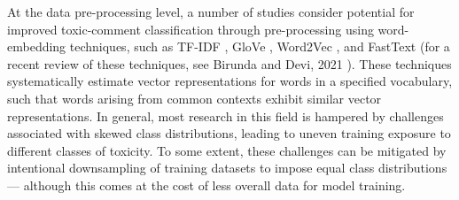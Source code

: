 At the data pre-processing level, a number of studies consider potential for improved toxic-comment classification through pre-processing using  word-embedding techniques, such as TF-IDF \cite{saha2018hateminers, de2021profiling, badjatiya2017deep}, GloVe \cite{badjatiya2017deep, ribeiro2019inf, founta2019unified}, Word2Vec \cite{gamback2017using}, and FastText \cite{ribeiro2019inf} (for a recent review of these techniques, see Birunda and Devi, 2021 \cite{selva2021review}). 
These techniques systematically estimate vector representations for words in a specified vocabulary, such that words arising from common contexts exhibit similar vector representations. 
In general, most research in this field is hampered by challenges associated with skewed class distributions, leading to uneven training exposure to different classes of toxicity. 
To some extent, these challenges can be mitigated by intentional downsampling of training datasets to impose equal class distributions --- although this comes at the cost of less overall data for model training.




